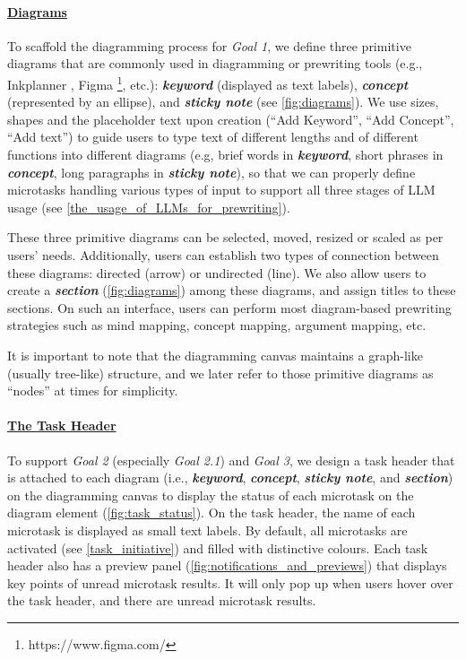 \paragraph{\underline{Diagrams}}
To scaffold the diagramming process for \textit{Goal 1}, we define three primitive diagrams that are commonly used in diagramming or prewriting tools (e.g., Inkplanner \cite{lu2018inkplanner}, Figma \footnote{https://www.figma.com/}, etc.): \textbf{\textcolor{keyword}{\textit{keyword}}} (displayed as text labels), \textbf{\textcolor{concept}{\textit{concept}}} (represented by an ellipse), and \textbf{\textcolor{sticky_note}{\textit{sticky note}}} (see \autoref{fig:diagrams}). We use sizes, shapes and the placeholder text upon creation (``Add Keyword'', ``Add Concept'', ``Add text'') to guide users to type text of different lengths and of different functions into different diagrams (e.g, brief words in \textbf{\textcolor{keyword}{\textit{keyword}}}, short phrases in \textbf{\textcolor{concept}{\textit{concept}}}, long paragraphs in \textbf{\textcolor{sticky_note}{\textit{sticky note}}}), so that we can properly define microtasks handling various types of input to support all three stages of LLM usage (see \ref{the_usage_of_LLMs_for_prewriting}).

These three primitive diagrams can be selected, moved, resized or scaled as per users' needs. Additionally, users can establish two types of connection between these diagrams: directed (arrow) or undirected (line). We also allow users to create a \textbf{\textcolor{section}{\textit{section}}} (\autoref{fig:diagrams}) among these diagrams, and assign titles to these sections. On such an interface, users can perform most diagram-based prewriting strategies such as mind mapping, concept mapping, argument mapping, etc.

It is important to note that the diagramming canvas maintains a graph-like (usually tree-like) structure, and we later refer to those primitive diagrams as ``nodes'' at times for simplicity.

\paragraph{\underline{The Task Header}}
To support \textit{Goal 2} (especially \textit{Goal 2.1}) and \textit{Goal 3}, we design a task header that is attached to each diagram (i.e., \textbf{\textcolor{keyword}{\textit{keyword}}}, \textbf{\textcolor{concept}{\textit{concept}}}, \textbf{\textcolor{sticky_note}{\textit{sticky note}}}, and \textbf{\textcolor{section}{\textit{section}}}) on the diagramming canvas to display the status of each microtask on the diagram element (\autoref{fig:task_status}). On the task header, the name of each microtask is displayed as small text labels. By default, all microtasks are activated (see \ref{task_initiative}) and filled with distinctive colours. Each task header also has a preview panel (\autoref{fig:notifications_and_previews}) that displays key points of unread microtask results. It will only pop up when users hover over the task header, and there are unread microtask results.

